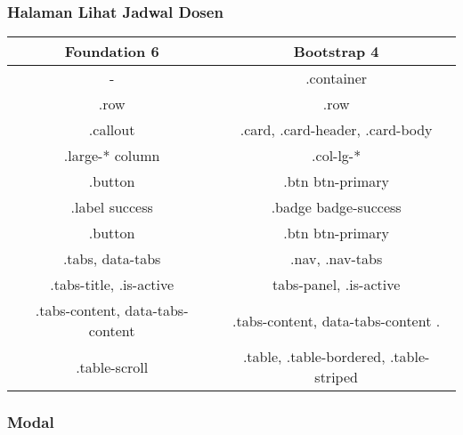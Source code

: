 \subsubsection{Halaman Lihat Jadwal Dosen}
\begin{tabular}{||c|c||} 
	\hline
	\textbf{Foundation 6} & \textbf{Bootstrap 4}  \\ [0.5ex] 
	\hline\hline
	- &   .container\\ 
	\hline	
	.row &  .row\\
	\hline	
	.callout &  .card, .card-header, .card-body \\
	\hline	
	.large-* column &  .col-lg-* \\
	\hline	
	.button &  .btn btn-primary\\
	\hline	
	.label success &  .badge badge-success \\	
	\hline	
	.button & .btn btn-primary  \\
	\hline	
	.tabs, data-tabs & .nav, .nav-tabs\\	
	\hline	
	.tabs-title, .is-active &  tabs-panel, .is-active \\
	\hline
	.tabs-content, data-tabs-content & .tabs-content, data-tabs-content . \\
	\hline	
	.table-scroll & .table, .table-bordered, .table-striped \\[1ex] 
	\hline 
\end{tabular}
\subsubsection{Modal}






